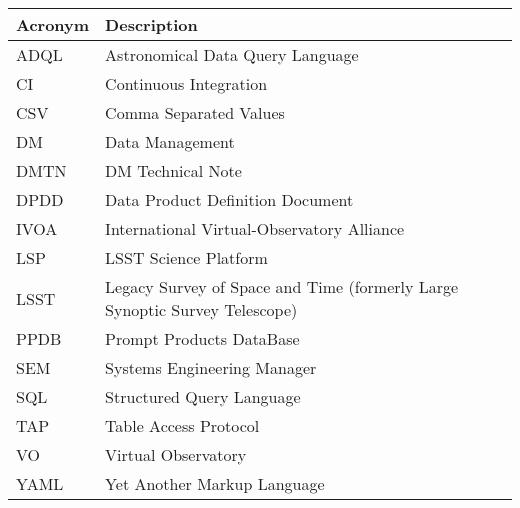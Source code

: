 \addtocounter{table}{-1}
\begin{longtable}{p{}p{}}\hline
\textbf{Acronym} & \textbf{Description}  \\\hline

ADQL & Astronomical Data Query Language \\\hline
CI & Continuous Integration \\\hline
CSV & Comma Separated Values \\\hline
DM & Data Management \\\hline
DMTN & DM Technical Note \\\hline
DPDD & Data Product Definition Document \\\hline
IVOA & International Virtual-Observatory Alliance \\\hline
LSP & LSST Science Platform \\\hline
LSST & Legacy Survey of Space and Time (formerly Large Synoptic Survey Telescope) \\\hline
PPDB & Prompt Products DataBase \\\hline
SEM & Systems Engineering Manager \\\hline
SQL & Structured Query Language \\\hline
TAP & Table Access Protocol \\\hline
VO & Virtual Observatory \\\hline
YAML & Yet Another Markup Language \\\hline
\end{longtable}
